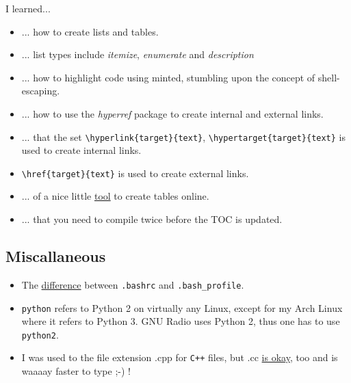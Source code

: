 \documentclass{article}
\begin{document}
I learned...
\begin{itemize} 
	\item ... how to create lists and tables.
	\item ... list types include \emph{itemize}, \emph{enumerate} and \emph{description}
	\item ... how to highlight code using minted, stumbling upon the concept of shell-escaping.
	\item ... how to use the \emph{hyperref} package to create internal and external links.
	\item ... that the set \verb|\hyperlink{target}{text}|, \verb|\hypertarget{target}{text}| is used to create internal links.
	\item \verb|\href{target}{text}| is used to create external links.
	\item ... of a nice little \href{http://www.tablesgenerator.com/}{tool} to create tables online.
	\item  ... that you need to compile twice before the TOC is updated.
\end{itemize}

\subsection{Miscallaneous}

\begin{itemize}
	\item The \href{http://www.joshstaiger.org/archives/2005/07/bash_profile_vs.html }{difference} between \verb|.bashrc| and \verb|.bash_profile|.
	
	\item \verb|python| refers to Python 2 on virtually any Linux, except for my Arch Linux where it refers to Python 3. GNU Radio uses Python 2, thus one has to use \verb|python2|. 
	
	\item I was used to the file extension .cpp for \texttt{C++} files, but .cc \href{http://stackoverflow.com/questions/1545080/c-code-file-extension-cc-vs-cpp}{is okay}, too and is waaaay faster to type ;-) !
\end{itemize}
\end{document}
